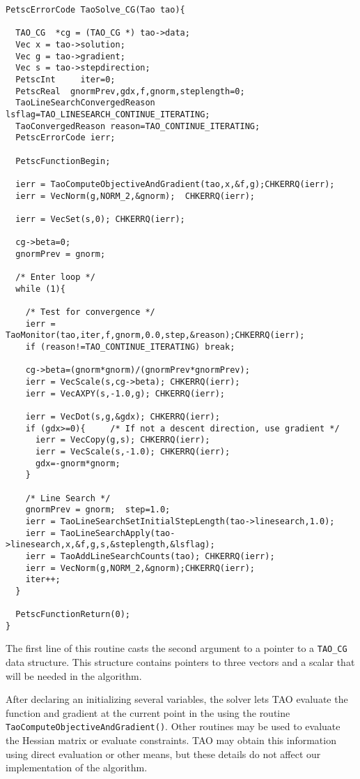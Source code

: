 \begin{verbatim}
PetscErrorCode TaoSolve_CG(Tao tao){

  TAO_CG  *cg = (TAO_CG *) tao->data;
  Vec x = tao->solution;
  Vec g = tao->gradient;
  Vec s = tao->stepdirection;
  PetscInt     iter=0;
  PetscReal  gnormPrev,gdx,f,gnorm,steplength=0;
  TaoLineSearchConvergedReason lsflag=TAO_LINESEARCH_CONTINUE_ITERATING;
  TaoConvergedReason reason=TAO_CONTINUE_ITERATING;
  PetscErrorCode ierr;

  PetscFunctionBegin;

  ierr = TaoComputeObjectiveAndGradient(tao,x,&f,g);CHKERRQ(ierr);
  ierr = VecNorm(g,NORM_2,&gnorm);  CHKERRQ(ierr);

  ierr = VecSet(s,0); CHKERRQ(ierr); 

  cg->beta=0;
  gnormPrev = gnorm;

  /* Enter loop */
  while (1){

    /* Test for convergence */
    ierr = TaoMonitor(tao,iter,f,gnorm,0.0,step,&reason);CHKERRQ(ierr);
    if (reason!=TAO_CONTINUE_ITERATING) break;

    cg->beta=(gnorm*gnorm)/(gnormPrev*gnormPrev);
    ierr = VecScale(s,cg->beta); CHKERRQ(ierr);
    ierr = VecAXPY(s,-1.0,g); CHKERRQ(ierr);
    
    ierr = VecDot(s,g,&gdx); CHKERRQ(ierr);
    if (gdx>=0){     /* If not a descent direction, use gradient */
      ierr = VecCopy(g,s); CHKERRQ(ierr);
      ierr = VecScale(s,-1.0); CHKERRQ(ierr);
      gdx=-gnorm*gnorm;
    } 

    /* Line Search */
    gnormPrev = gnorm;  step=1.0;
    ierr = TaoLineSearchSetInitialStepLength(tao->linesearch,1.0);
    ierr = TaoLineSearchApply(tao->linesearch,x,&f,g,s,&steplength,&lsflag);
    ierr = TaoAddLineSearchCounts(tao); CHKERRQ(ierr);
    ierr = VecNorm(g,NORM_2,&gnorm);CHKERRQ(ierr);
    iter++;
  }
  
  PetscFunctionReturn(0);
}
\end{verbatim}

The first line of this routine casts the second argument to a pointer
to a {\tt TAO\_CG} data structure.  This structure contains pointers
to three vectors and a scalar that will be needed in the algorithm.

After declaring an initializing several variables, the solver lets TAO 
evaluate the function and gradient at the
current point in the using the routine 
{\tt Tao\-Compute\-Objective\-And\-Gradient()}.
Other routines may be used to evaluate the Hessian matrix or evaluate
constraints.  TAO may obtain this information using direct evaluation 
or other means, but these details do not affect our implementation
of the algorithm.

